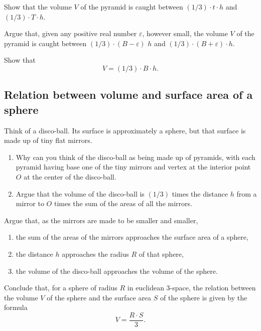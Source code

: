 \begin{exercise}
Show that the volume $V$ of the pyramid is caught between
$\left(  1/3\right)  \cdot t\cdot h$ and
$\left(  1/3\right)  \cdot T\cdot h$.
\end{exercise}

\begin{exercise}
Argue that, given any positive real number $\varepsilon$,
however small, the volume $V$ of the pyramid is caught between $\left(
1/3\right)  \cdot \left(  B-\varepsilon\right)  $%
\textperiodcentered$h$ and $\left(  1/3\right)  \cdot \left(
B+\varepsilon\right)  \cdot h$.
\end{exercise}

\begin{exercise}
Show that
\[
V=\left(  1/3\right)  \cdot B\cdot h.
\]
\end{exercise}

\subsection*{Relation between volume and surface area of a sphere}

Think of a disco-ball. Its surface is approximately a sphere, but that surface
is made up of tiny flat mirrors.

\begin{exercise}\hfil
\begin{enumerate}
\item Why can you think of the disco-ball as being made up of
pyramids, with each pyramid having base one of the tiny mirrors and vertex at
the interior point $O$ at the center of the disco-ball.
\item Argue that the volume of the disco-ball is $\left(  1/3\right)  $ times the
distance $h$ from a mirror to $O$ times the sum of the areas of all the mirrors.
\end{enumerate}
\end{exercise}

\begin{exercise}
Argue that, as the mirrors are made to be smaller and smaller,
\begin{enumerate}
\item the sum of the areas of the mirrors approaches the surface area of a sphere,
\item the distance $h$ approaches the radius $R$ of that sphere,
\item the volume of the disco-ball approaches the volume of the sphere.
\end{enumerate}
Conclude that, for a sphere of radius $R$ in euclidean $3$-space, the relation
between the volume $V$ of the sphere and the surface area $S$ of the sphere is
given by the formula%
\[
V=\frac{R\cdot S}{3}.
\]
\end{exercise}

